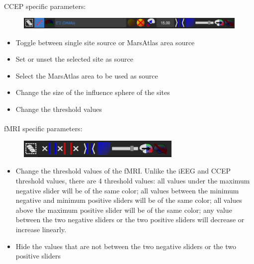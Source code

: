\documentclass[a4paper]{article}
\begin{document}
\paragraph{} CCEP specific parameters:
\begin{figure}[H]
\begin{center}
\includegraphics[scale=0.5]{CCEPSettings.png}
\end{center}
\end{figure}
\begin{itemize}
\item Toggle between single site source or MarsAtlas area source
\item Set or unset the selected site as source
\item Select the MarsAtlas area to be used as source
\item Change the size of the influence sphere of the sites
\item Change the threshold values
\end{itemize}
\paragraph{} fMRI specific parameters:
\begin{figure}[H]
\begin{center}
\includegraphics[scale=0.5]{fMRISettings.png}
\end{center}
\end{figure}
\begin{itemize}
\item Change the threshold values of the fMRI. Unlike the iEEG and CCEP threshold values, there are 4 threshold values: all values under the maximum negative slider will be of the same color; all values between the minimum negative and minimum positive sliders will be of the same color; all values above the maximum positive slider will be of the same color; any value between the two negative sliders or the two positive sliders will decrease or increase linearly.
\item Hide the values that are not between the two negative sliders or the two positive sliders
\end{itemize}
\end{document}
